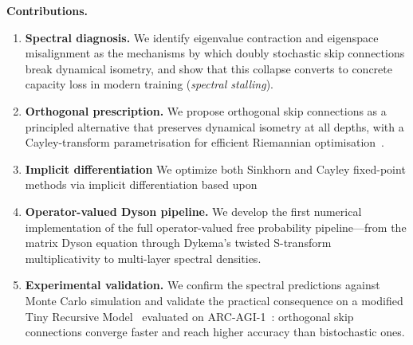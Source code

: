 \medskip
\noindent\textbf{Contributions.}
\begin{enumerate}
\item \textbf{Spectral diagnosis.} We identify eigenvalue contraction and eigenspace misalignment as the mechanisms by which doubly stochastic skip connections break dynamical isometry, and show that this collapse converts to concrete capacity loss in modern training (\emph{spectral stalling}).

\item \textbf{Orthogonal prescription.} We propose orthogonal skip connections as a principled alternative that preserves dynamical isometry at all depths, with a Cayley-transform parametrisation for efficient Riemannian optimisation~\cite{li2020cayley,lezcano2019trivializations}.

\item \textbf{Implicit differentiation} We optimize both Sinkhorn and Cayley fixed-point methods via implicit differentiation based upon \cite{A unified framework for implicit sinkhorn differentiation}

\item \textbf{Operator-valued Dyson pipeline.} We develop the first numerical implementation of the full operator-valued free probability pipeline---from the matrix Dyson equation through Dykema's twisted S-transform multiplicativity to multi-layer spectral densities.

\item \textbf{Experimental validation.} We confirm the spectral predictions against Monte Carlo simulation and validate the practical consequence on a modified Tiny Recursive Model~\cite{jolicoeur2025trm} evaluated on ARC-AGI-1~\cite{chollet2019arc}: orthogonal skip connections converge faster and reach higher accuracy than bistochastic ones.
\end{enumerate}
